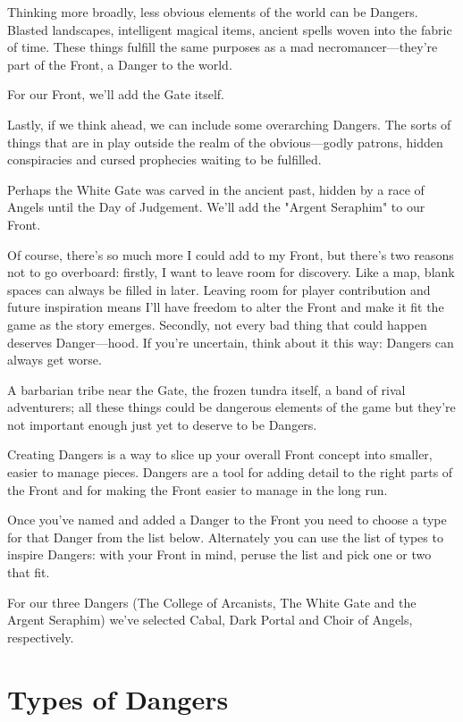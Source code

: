 Thinking more broadly, less obvious elements of the world can be Dangers. Blasted landscapes, intelligent magical items, ancient spells woven into the fabric of time. These things fulfill the same purposes as a mad necromancer—they're part of the Front, a Danger to the world.

 
\startExample
For our Front, we'll add the Gate itself.
\stopExample
 

Lastly, if we think ahead, we can include some overarching Dangers. The sorts of things that are in play outside the realm of the obvious—godly patrons, hidden conspiracies and cursed prophecies waiting to be fulfilled.

 
\startExample
Perhaps the White Gate was carved in the ancient past, hidden by a race of Angels until the Day of Judgement. We'll add the "Argent Seraphim" to our Front.
\stopExample
 

Of course, there's so much more I could add to my Front, but there's two reasons not to go overboard: firstly, I want to leave room for discovery. Like a map, blank spaces can always be filled in later. Leaving room for player contribution and future inspiration means I'll have freedom to alter the Front and make it fit the game as the story emerges. Secondly, not every bad thing that could happen deserves Danger—hood. If you're uncertain, think about it this way: Dangers can always get worse.

  
\startExample
A barbarian tribe near the Gate, the frozen tundra itself, a band of rival adventurers; all these things could be dangerous elements of the game but they're not important enough just yet to deserve to be Dangers.
\stopExample
 

Creating Dangers is a way to slice up your overall Front concept into smaller, easier to manage pieces. Dangers are a tool for adding detail to the right parts of the Front and for making the Front easier to manage in the long run.

 

Once you've named and added a Danger to the Front you need to choose a type for that Danger from the list below. Alternately you can use the list of types to inspire Dangers: with your Front in mind, peruse the list and pick one or two that fit.

 
\startExample
For our three Dangers (The College of Arcanists, The White Gate and the Argent Seraphim) we've selected Cabal, Dark Portal and Choir of Angels, respectively.
\stopExample
 
\section{Types of Dangers}    
 
